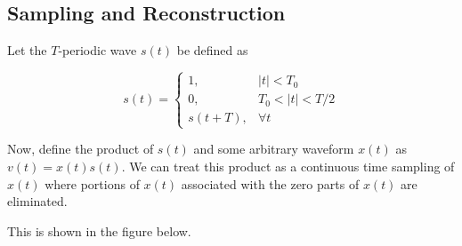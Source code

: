 \documentclass[12pt]{article}
\begin{document}
\begin{enumerate}[\qquad 1)]
\newpage
\subsection*{Sampling and Reconstruction}

Let the $T$-periodic wave $s(t)$ be defined as

\[s(t) = \begin{cases}
    1, & |t| < T_0 \\
    0, & T_0 < |t| < T/2 \\
    s(t+T), & \forall t
    \end{cases}\]

Now, define the product of $s(t)$ and some arbitrary waveform $x(t)$ as $v(t) = x(t)s(t)$. We can treat this product as a continuous time sampling of $x(t)$ where portions of $x(t)$ associated with the zero parts of $x(t)$ are eliminated. 

This is shown in the figure below.


\end{enumerate}
\end{document}
